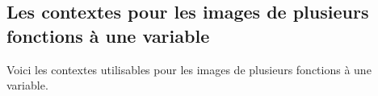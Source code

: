 \documentclass[12pt, a4paper]{article}
\begin{document}

\subsection{Les contextes pour les images de plusieurs fonctions à une variable}

Voici les contextes utilisables pour les images de plusieurs fonctions à une variable.

\medskip

\begin{itemize*}[before = \leavevmode\kern15pt, itemjoin = \kern15pt]
	\item {}

	\item {}
\end{itemize*}
\end{document}
